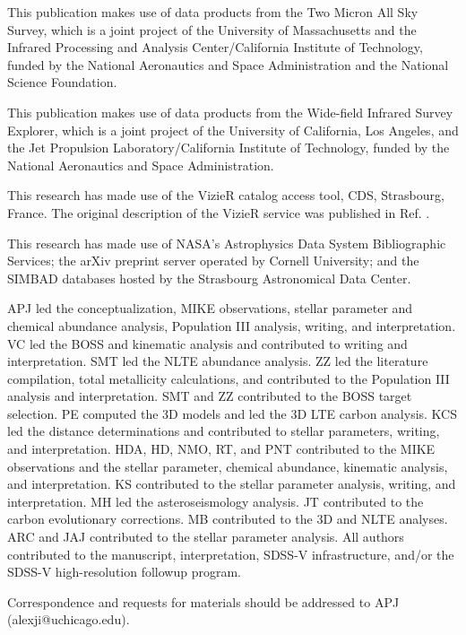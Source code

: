 \documentclass{natureprintstyle}
\begin{document}
\begin{addendum}
This publication makes use of data products from the Two Micron All
Sky Survey, which is a joint project of the University of Massachusetts
and the Infrared Processing and Analysis Center/California Institute of
Technology, funded by the National Aeronautics and Space Administration
and the National Science Foundation.

This publication makes use of data products from the Wide-field Infrared
Survey Explorer, which is a joint project of the University of California,
Los Angeles, and the Jet Propulsion Laboratory/California Institute of
Technology, funded by the National Aeronautics and Space Administration.

This research has made use of the VizieR catalog access tool, CDS,
Strasbourg, France.  The original description of the VizieR service was
published in Ref. \cite{och00}.

This research has made use of NASA’s Astrophysics Data System Bibliographic Services; the arXiv preprint server operated by Cornell University; and the SIMBAD databases hosted by the Strasbourg Astronomical Data Center.

\item[Author Contributions] 
APJ led the conceptualization, MIKE observations, stellar parameter and chemical abundance analysis, Population III analysis, writing, and interpretation. VC led the BOSS and kinematic analysis and contributed to writing and interpretation. SMT led the NLTE abundance analysis. ZZ led the literature compilation, total metallicity calculations, and contributed to the Population III analysis and interpretation. SMT and ZZ contributed to the BOSS target selection. PE computed the 3D models and led the 3D LTE carbon analysis. KCS led the distance determinations and contributed to stellar parameters, writing, and interpretation. HDA, HD, NMO, RT, and PNT contributed to the MIKE observations and the stellar parameter, chemical abundance, kinematic analysis, and interpretation. KS contributed to the stellar parameter analysis, writing, and interpretation. MH led the asteroseismology analysis. JT contributed to the carbon evolutionary corrections. MB contributed to the 3D and NLTE analyses. ARC and JAJ contributed to the stellar parameter analysis. All authors contributed to the manuscript, interpretation, SDSS-V infrastructure, and/or the SDSS-V high-resolution followup program.

\item[Author Information] Correspondence and requests for materials should be addressed to APJ (alexji@uchicago.edu).


\end{addendum}
\end{document}
